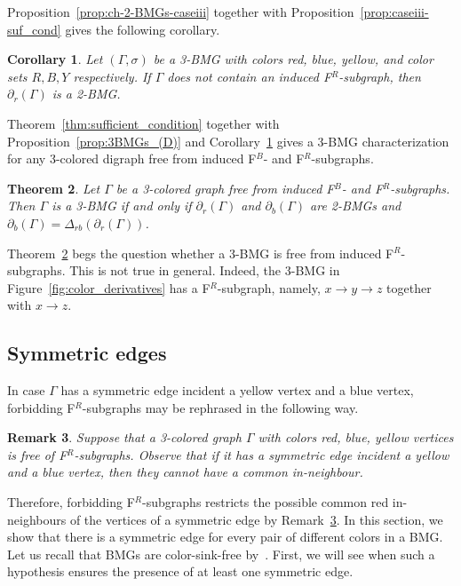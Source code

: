 \documentclass[final,3p,times]{elsarticle}
\newtheorem{theorem}{Theorem}[section]
\newtheorem{corollary}[theorem]{Corollary}%
\newtheorem{remark}[theorem]{Remark}%
\begin{document}
Proposition~\ref{prop:ch-2-BMGs-caseiii} together with Proposition~\ref{prop:caseiii-suf_cond} gives the following corollary.

\begin{corollary}
\label{cor:2BMGsD-forbidden}
Let $(\Gamma,\sigma)$ be a 3-BMG with colors red, blue, yellow, and color sets $R,B,Y$ respectively. If $\Gamma$ does not contain an induced F$^R$-subgraph, then $\partial_r(\Gamma)$ is a 2-BMG.
\end{corollary}

Theorem~\ref{thm:sufficient_condition} together with Proposition~\ref{prop:3BMGs_(D)} and Corollary~\ref{cor:2BMGsD-forbidden} gives a 3-BMG characterization for any 3-colored digraph free from induced F$^B$- and F$^R$-subgraphs.

\begin{theorem}\label{thm:characterization3BMG_forbidden}
Let $\Gamma$ be a 3-colored graph free from induced F$^B$- and F$^R$-subgraphs. Then $\Gamma$ is a 3-BMG if and only if $\partial_{r}(\Gamma)$ and $\partial_{b}(\Gamma)$ are 2-BMGs and $\partial_b(\Gamma)=\Delta_{rb}(\partial_r(\Gamma))$.
\end{theorem}

Theorem~\ref{thm:characterization3BMG_forbidden} begs the question whether a 3-BMG is free from induced F$^R$-subgraphs. This is not true in general. Indeed, the 3-BMG in Figure~\ref{fig:color_derivatives} has a F$^R$-subgraph, namely, $x \rightarrow y \rightarrow z$ together with $x\rightarrow z$.

\subsection{Symmetric edges}\label{sec:sym_edges}
In case $\Gamma$ has a symmetric edge incident a yellow vertex and a blue vertex, forbidding F$^R$-subgraphs may be rephrased in the following way.

\begin{remark}\label{rmk:sym_F^R}
Suppose that a 3-colored graph $\Gamma$ with colors red, blue, yellow vertices is free of F$^R$-subgraphs. Observe that if it has a symmetric edge incident a yellow and a blue vertex, then they cannot have a common in-neighbour. 
\end{remark}

Therefore, forbidding F$^R$-subgraphs restricts the possible common red in-neighbours of the vertices of a symmetric edge by Remark~\ref{rmk:sym_F^R}. In this section, we show that there is a symmetric edge for every pair of different colors in a BMG. Let us recall that BMGs are color-sink-free by~\cite[Proposition~2.3]{korchmaros2021quasi}. First, we will see when such a hypothesis ensures the presence of at least one symmetric edge. 
\end{document}
